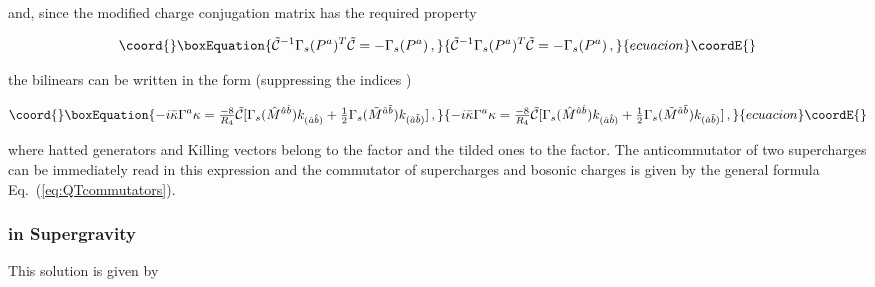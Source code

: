 \documentclass[12pt,a4paper]{article}
\begin{document}
\noindent
and, since the modified charge conjugation matrix \coordHE{} has the required property

\begin{equation}\coord{}\boxEquation{
\label{eq:property}
\tilde{\mathcal{C}}^{-1}\Gamma_{s}(P^{a})^{T}\tilde{\mathcal{C}} 
= -\Gamma_{s}(P^{a})\, ,
}{
\tilde{\mathcal{C}}^{-1}\Gamma_{s}(P^{a})^{T}\tilde{\mathcal{C}} 
= -\Gamma_{s}(P^{a})\, ,
}{ecuacion}\coordE{}\end{equation}

\noindent
the bilinears can be written in the form (suppressing the indices
\myHighlight{$\alpha,\beta$}\coordHE{})

\begin{equation}\coord{}\boxEquation{
-i\bar{\kappa}\Gamma^{a}\kappa = {\textstyle\frac{-8}{R_{4}}} 
\tilde{\mathcal{C}}[\Gamma_{s}(\hat{M}^{\hat{a}\hat{b}})k_{(\hat{a}\hat{b})}
+{\textstyle\frac{1}{2}}\Gamma_{s}(\tilde{M}^{\tilde{a}\tilde{b}})
k_{(\tilde{a}\tilde{b})}]\, ,
}{
-i\bar{\kappa}\Gamma^{a}\kappa = {\textstyle\frac{-8}{R_{4}}} 
\tilde{\mathcal{C}}[\Gamma_{s}(\hat{M}^{\hat{a}\hat{b}})k_{(\hat{a}\hat{b})}
+{\textstyle\frac{1}{2}}\Gamma_{s}(\tilde{M}^{\tilde{a}\tilde{b}})
k_{(\tilde{a}\tilde{b})}]\, ,
}{ecuacion}\coordE{}\end{equation}

\noindent
where hatted generators and Killing vectors belong to the \coordHE{} factor
and the tilded ones to the \coordHE{} factor. The
anticommutator of two supercharges can be immediately read in this
expression and the commutator of supercharges and bosonic charges is
given by the general formula Eq.~(\ref{eq:QTcommutators}).


\subsubsection{\coordHE{} in \coordHE{} Supergravity}

This solution is given by
\end{document}
